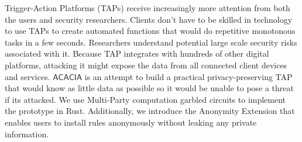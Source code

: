 \begin{abstract}
  
\end{abstract}

Trigger-Action Platforms (TAPs) receive increasingly more attention from both the users and security
researchers. Clients don't have to be skilled in technology to use TAPs to create automated functions
that would do repetitive monotonous tasks in a few seconds. Researchers understand potential large
scale security risks associated with it. Because TAP integrates with hundreds of other digital platforms,
attacking it might expose the data from all connected client devices and services. $\mathsf{ACACIA}$ is
an attempt to build a practical privacy-preserving TAP that would know as little data as possible so it
would be unable to pose a threat if its attacked. We use Multi-Party computation garbled circuits to
implement the prototype in Rust. Additionally, we introduce the Anonymity Extension that enables users
to install rules anonymously without leaking any private information. 